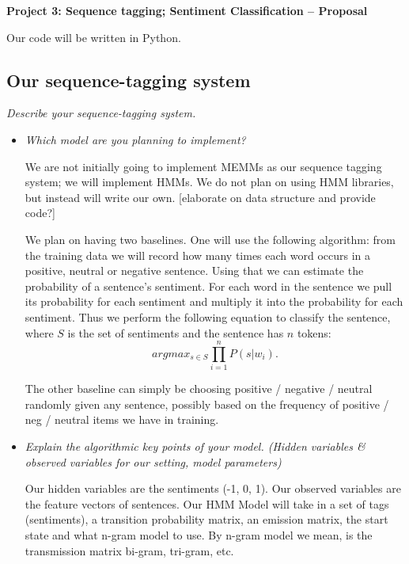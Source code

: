 \documentclass{article}
\begin{document}
\begin{center}\textbf{Project 3: Sequence tagging; Sentiment Classification -- Proposal}\end{center}

Our code will be written in Python.

\subsection*{Our sequence-tagging system}

\textit{Describe your sequence-tagging system.}\par

\begin{itemize}
\item \textit{Which model are you planning to implement?}\par

We are not initially going to implement MEMMs as our sequence tagging system; we will implement HMMs. We do not plan on using HMM libraries, but instead will write our own. [elaborate on data structure and provide code?]

We plan on having two baselines. One will use the following algorithm: from the training data we will record how many times each word occurs in a positive, neutral or negative sentence. Using that we can estimate the probability of a sentence's sentiment. For each word in the sentence we pull its probability for each sentiment and multiply it into the probability for each sentiment. Thus we perform the following equation to classify the sentence, where $S$ is the set of sentiments and the sentence has $n$ tokens:
\[argmax_{s \in S}{\prod_{i=1}^n} P(s|w_i).\]

The other baseline can simply be choosing positive / negative / neutral randomly given any sentence, possibly based on the frequency of positive / neg / neutral items we have in training.

\item \textit{Explain the algorithmic key points of your model. (Hidden variables \& observed variables for our setting, model parameters)}\par

Our hidden variables are the sentiments (-1, 0, 1). Our observed variables are the feature vectors of sentences. Our HMM Model will take in a set of tags (sentiments), a transition probability matrix, an emission matrix, the start state and what n-gram model to use. By n-gram model we mean, is the transmission matrix bi-gram, tri-gram, etc.


\end{itemize}
\end{document}
